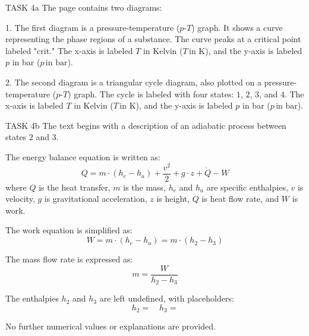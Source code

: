 TASK 4a  
The page contains two diagrams:  

1. The first diagram is a pressure-temperature (\(p\)-\(T\)) graph. It shows a curve representing the phase regions of a substance. The curve peaks at a critical point labeled "crit." The x-axis is labeled \(T\) in Kelvin (\(T \, \text{in K}\)), and the y-axis is labeled \(p\) in bar (\(p \, \text{in bar}\)).  

2. The second diagram is a triangular cycle diagram, also plotted on a pressure-temperature (\(p\)-\(T\)) graph. The cycle is labeled with four states: \(1\), \(2\), \(3\), and \(4\). The x-axis is labeled \(T\) in Kelvin (\(T \, \text{in K}\)), and the y-axis is labeled \(p\) in bar (\(p \, \text{in bar}\)).  

TASK 4b  
The text begins with a description of an adiabatic process between states \(2\) and \(3\).  

The energy balance equation is written as:  
\[
Q = m \cdot (h_e - h_a) + \frac{v^2}{2} + g \cdot z + \dot{Q} - W
\]  
where \(Q\) is the heat transfer, \(m\) is the mass, \(h_e\) and \(h_a\) are specific enthalpies, \(v\) is velocity, \(g\) is gravitational acceleration, \(z\) is height, \(\dot{Q}\) is heat flow rate, and \(W\) is work.  

The work equation is simplified as:  
\[
W = m \cdot (h_e - h_a) = m \cdot (h_2 - h_3)
\]  

The mass flow rate is expressed as:  
\[
m = \frac{W}{h_2 - h_3}
\]  

The enthalpies \(h_2\) and \(h_3\) are left undefined, with placeholders:  
\[
h_2 = \quad h_3 =
\]  

No further numerical values or explanations are provided.